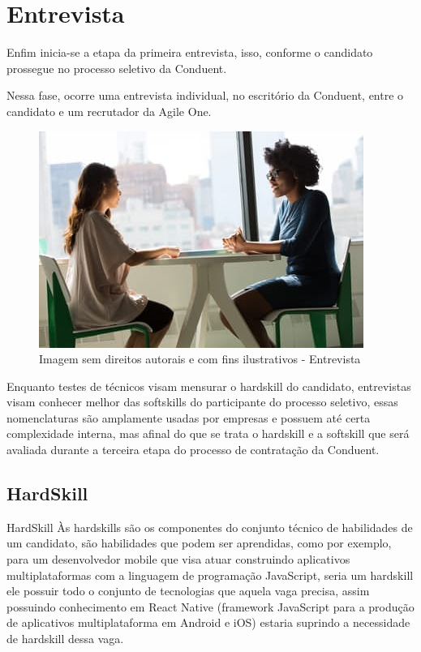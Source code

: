 \documentclass[12pt]{article}
\begin{document}
\section{Entrevista}
Enfim inicia-se a etapa da primeira entrevista, isso, conforme o candidato prossegue no processo seletivo da Conduent. 

Nessa fase, ocorre uma entrevista individual, no escritório da Conduent, entre o candidato e um recrutador da Agile One.

\begin{figure}[h]
	\centering
	\includegraphics[scale=0.7]{build/images/interview.jpeg}
	\caption{Imagem sem direitos autorais e com fins ilustrativos - Entrevista}
	\label{fig:mesh1}
\end{figure}
Enquanto testes de técnicos visam mensurar o hardskill do candidato, entrevistas visam conhecer melhor das softskills do participante do processo seletivo, essas nomenclaturas são amplamente usadas por empresas e possuem até certa complexidade interna, mas afinal do que se trata o hardskill e a softskill que será avaliada durante a terceira etapa do processo de contratação da Conduent.

\subsection{HardSkill}
HardSkill
Às hardskills são os componentes do conjunto técnico de habilidades de um candidato, são habilidades que podem ser aprendidas, como por exemplo, para um desenvolvedor mobile que visa atuar construindo aplicativos multiplataformas com a linguagem de programação JavaScript, seria um hardskill ele possuir todo o conjunto de tecnologias que aquela vaga precisa, assim possuindo conhecimento em React Native (framework JavaScript para a produção de aplicativos multiplataforma em Android e iOS) estaria suprindo a necessidade de hardskill dessa vaga. 
\end{document}
